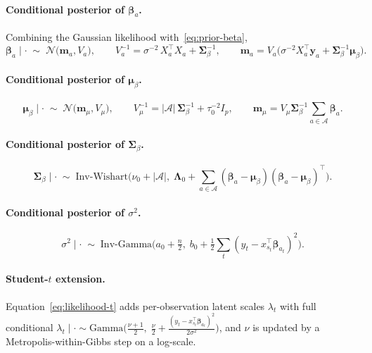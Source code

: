 \documentclass[11pt]{article}
\newcommand{\N}{\mathcal{N}}
\newcommand{\IG}{\mathrm{Inv\text{-}Gamma}}
\newcommand{\IW}{\mathrm{Inv\text{-}Wishart}}
\begin{document}
\paragraph{Conditional posterior of $\bm\beta_a$.} Combining the Gaussian likelihood with~\eqref{eq:prior-beta},
\begin{equation}
\label{eq:full-cond-beta}
\bm\beta_a \mid \cdot \;\sim\; \N\!\big(\bm m_a, V_a\big), \qquad
V_a^{-1} = \sigma^{-2}\, X_a^\top X_a + \bm\Sigma_\beta^{-1}, \qquad
\bm m_a = V_a\big(\sigma^{-2} X_a^\top \bm y_a + \bm\Sigma_\beta^{-1} \bm\mu_\beta\big).
\end{equation}

\paragraph{Conditional posterior of $\bm\mu_\beta$.}
\begin{equation}
\bm\mu_\beta \mid \cdot \;\sim\; \N\!\big(\bm m_\mu, V_\mu\big), \qquad
V_\mu^{-1} = |\mathcal{A}|\,\bm\Sigma_\beta^{-1} + \tau_0^{-2} I_p, \qquad
\bm m_\mu = V_\mu \bm\Sigma_\beta^{-1} \!\!\sum_{a\in\mathcal{A}} \bm\beta_a.
\end{equation}

\paragraph{Conditional posterior of $\bm\Sigma_\beta$.}
\begin{equation}
\bm\Sigma_\beta \mid \cdot \;\sim\; \IW\!\bigg(\nu_0 + |\mathcal{A}|,\; \bm\Lambda_0 + \!\!\sum_{a\in\mathcal{A}}(\bm\beta_a - \bm\mu_\beta)(\bm\beta_a - \bm\mu_\beta)^\top \bigg).
\end{equation}

\paragraph{Conditional posterior of $\sigma^2$.}
\begin{equation}
\sigma^2 \mid \cdot \;\sim\; \IG\!\bigg(a_0 + \tfrac{n}{2},\; b_0 + \tfrac{1}{2}\sum_t (y_t - x_{s_t}^\top \bm\beta_{a_t})^2\bigg).
\end{equation}

\paragraph{Student-$t$ extension.} Equation~\eqref{eq:likelihood-t} adds per-observation latent scales $\lambda_t$ with full conditional $\lambda_t \mid \cdot \sim \mathrm{Gamma}\!\big(\tfrac{\nu+1}{2},\; \tfrac{\nu}{2} + \tfrac{(y_t - x_{s_t}^\top\bm\beta_{a_t})^2}{2\sigma^2}\big)$, and $\nu$ is updated by a Metropolis-within-Gibbs step on a log-scale.
\end{document}
